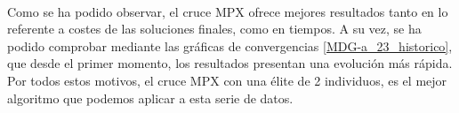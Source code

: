 	\paragraph{} Como se ha podido observar, el cruce MPX ofrece mejores resultados tanto en lo referente a costes de las soluciones finales, como en tiempos. A su vez, se ha podido comprobar mediante las gráficas de convergencias \ref{MDG-a_23_historico}, que desde el primer momento, los resultados presentan una evolución más rápida. Por todos estos motivos, el cruce MPX con una élite de 2 individuos, es el mejor algoritmo que podemos aplicar a esta serie de datos.

	
	\paragraph{} 
	
